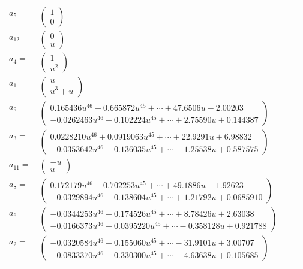 \documentclass[1p]{elsarticle_modified}
\theoremstyle{definition}
\begin{document}
\begin{tabular}{m{7pt} m{180pt} m{7pt} m{180pt} }
\flushright $a_{5}=$&$\begin{pmatrix}1\\0\end{pmatrix}$ \\
\flushright $a_{12}=$&$\begin{pmatrix}0\\u\end{pmatrix}$ \\
\flushright $a_{4}=$&$\begin{pmatrix}1\\u^2\end{pmatrix}$ \\
\flushright $a_{1}=$&$\begin{pmatrix}u\\u^3+u\end{pmatrix}$ \\
\flushright $a_{9}=$&$\begin{pmatrix}0.165436 u^{46}+0.665872 u^{45}+\cdots+47.6506 u-2.00203\\-0.0262463 u^{46}-0.102224 u^{45}+\cdots+2.75590 u+0.144387\end{pmatrix}$ \\
\flushright $a_{3}=$&$\begin{pmatrix}0.0228210 u^{46}+0.0919063 u^{45}+\cdots+22.9291 u+6.98832\\-0.0353642 u^{46}-0.136035 u^{45}+\cdots-1.25538 u+0.587575\end{pmatrix}$ \\
\flushright $a_{11}=$&$\begin{pmatrix}- u\\u\end{pmatrix}$ \\
\flushright $a_{8}=$&$\begin{pmatrix}0.172179 u^{46}+0.702253 u^{45}+\cdots+49.1886 u-1.92623\\-0.0329894 u^{46}-0.138604 u^{45}+\cdots+1.21792 u+0.0685910\end{pmatrix}$ \\
\flushright $a_{6}=$&$\begin{pmatrix}-0.0344253 u^{46}-0.174526 u^{45}+\cdots+8.78426 u+2.63038\\-0.0166373 u^{46}-0.0395220 u^{45}+\cdots-0.358128 u+0.921788\end{pmatrix}$ \\
\flushright $a_{2}=$&$\begin{pmatrix}-0.0320584 u^{46}-0.155060 u^{45}+\cdots-31.9101 u+3.00707\\-0.0833370 u^{46}-0.330300 u^{45}+\cdots-4.63638 u+0.105685\end{pmatrix}$ \\

\end{tabular}
\end{document}
